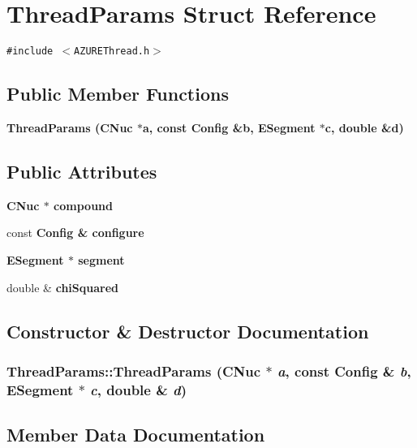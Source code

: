 \section{Thread\-Params Struct Reference}
\label{structThreadParams}
{\tt \#include $<$AZUREThread.h$>$}

\subsection*{Public Member Functions}
\begin{CompactItemize}
\item 
\bf{Thread\-Params} (\bf{CNuc} $\ast$a, const \bf{Config} \&b, \bf{ESegment} $\ast$c, double \&d)
\end{CompactItemize}
\subsection*{Public Attributes}
\begin{CompactItemize}
\item 
\bf{CNuc} $\ast$ \bf{compound}
\item 
const \bf{Config} \& \bf{configure}
\item 
\bf{ESegment} $\ast$ \bf{segment}
\item 
double \& \bf{chi\-Squared}
\end{CompactItemize}


\subsection{Constructor \& Destructor Documentation}
\subsubsection{\setlength{\rightskip}{0pt plus 5cm}Thread\-Params::Thread\-Params (\bf{CNuc} $\ast$ {\em a}, const \bf{Config} \& {\em b}, \bf{ESegment} $\ast$ {\em c}, double \& {\em d})\hspace{0.3cm}{\tt  [inline]}}\label{structThreadParams_457c4ac47393453983028a7d1ce9d67a}




\subsection{Member Data Documentation}
